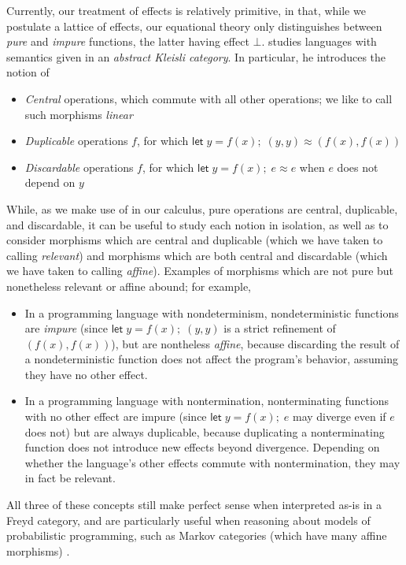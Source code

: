 \documentclass[acmsmall,screen,review]{acmart}
\newcommand{\ms}[1]{\ensuremath{\mathsf{#1}}}
\newcommand{\letexpr}[3]{\ensuremath{\ms{let}\;#1 = #2;\;#3}}
\newcommand{\teqv}{\approx}
\begin{document}
Currently, our treatment of effects is relatively primitive, in that, while we postulate a lattice
of effects, our equational theory only distinguishes between \emph{pure} and \emph{impure}
functions, the latter having effect $\bot$. \citet{fuhrmann-direct-1999} studies languages with
semantics given in an \emph{abstract Kleisli category}. In particular, he introduces the notion of
\begin{itemize}
  \item \emph{Central} operations, which commute with all other operations; we like to call such
  morphisms \emph{linear}
  \item \emph{Duplicable} operations $f$, for which $\letexpr{y}{f(x)}{(y, y)} \teqv (f(x), f(x))$
  \item \emph{Discardable} operations $f$, for which $\letexpr{y}{f(x)}{e} \teqv e$ when $e$ does
  not depend on $y$
\end{itemize}
While, as we make use of in our calculus, pure operations are central, duplicable, and discardable,
it can be useful to study each notion in isolation, as well as to consider morphisms which are
central and duplicable (which we have taken to calling \emph{relevant}) and morphisms which are
both central and discardable (which we have taken to calling \emph{affine}). Examples of morphisms
which are not pure but nonetheless relevant or affine abound; for example,
\begin{itemize}
  \item In a programming language with nondeterminism, nondeterministic functions are \emph{impure}
  (since $\letexpr{y}{f(x)}{(y, y)}$ is a strict refinement of $(f(x), f(x))$), but are nontheless
  \emph{affine}, because discarding the result of a nondeterministic function does not affect the
  program's behavior, assuming they have no other effect.
  \item In a programming language with nontermination, nonterminating functions with no other effect
  are impure (since $\letexpr{y}{f(x)}{e}$ may diverge even if $e$ does not) but are always
  duplicable, because duplicating a nonterminating function does not introduce new effects beyond
  divergence. Depending on whether the language's other effects commute with nontermination, they
  may in fact be relevant.
\end{itemize}
All three of these concepts still make perfect sense when interpreted as-is in a Freyd category, and
are particularly useful when reasoning about models of probabilistic programming, such as Markov
categories (which have many affine morphisms) \cite{nlab:markov-category}.
\end{document}
